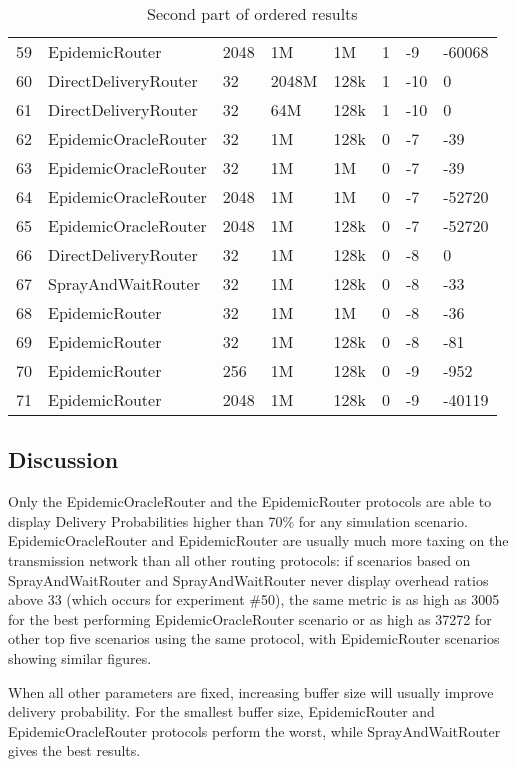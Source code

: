 \begin{table}[htpb]
\begin{tabular}{@{}p{}p{}p{}p{}p{}p{}p{}p{}@{}}
59 & EpidemicRouter & 2048 & 1M & 1M & 1 & -9 & -60068 \\
60 & DirectDeliveryRouter & 32 & 2048M & 128k & 1 & -10 & 0 \\
61 & DirectDeliveryRouter & 32 & 64M & 128k & 1 & -10 & 0 \\
62 & EpidemicOracleRouter & 32 & 1M & 128k & 0 & -7 & -39 \\
63 & EpidemicOracleRouter & 32 & 1M & 1M & 0 & -7 & -39 \\
64 & EpidemicOracleRouter & 2048 & 1M & 1M & 0 & -7 & -52720 \\
65 & EpidemicOracleRouter & 2048 & 1M & 128k & 0 & -7 & -52720 \\
66 & DirectDeliveryRouter & 32 & 1M & 128k & 0 & -8 & 0 \\
67 & SprayAndWaitRouter & 32 & 1M & 128k & 0 & -8 & -33 \\
68 & EpidemicRouter & 32 & 1M & 1M & 0 & -8 & -36 \\
69 & EpidemicRouter & 32 & 1M & 128k & 0 & -8 & -81 \\
70 & EpidemicRouter & 256 & 1M & 128k & 0 & -9 & -952 \\
71 & EpidemicRouter & 2048 & 1M & 128k & 0 & -9 & -40119 \\ \bottomrule
\end{tabular}
\caption{Second part of ordered results}
\label{tab:res2}
\end{table}

\subsection{Discussion}

Only the EpidemicOracleRouter and the EpidemicRouter protocols are able to
display Delivery Probabilities higher than 70\% for any simulation scenario.
EpidemicOracleRouter and EpidemicRouter are usually much more taxing on the
transmission network than all other routing protocols: if scenarios based on
SprayAndWaitRouter and SprayAndWaitRouter never display overhead ratios above
33 (which occurs for experiment \#50), the same metric is as high as 3005 for the
best performing EpidemicOracleRouter scenario or as high as 37272 for other
top five scenarios using the same protocol, with EpidemicRouter scenarios
showing similar figures.

When all other parameters are fixed, increasing buffer size will usually
improve delivery probability.  For the smallest buffer size, EpidemicRouter and
EpidemicOracleRouter protocols perform the worst, while SprayAndWaitRouter
gives the best results.

